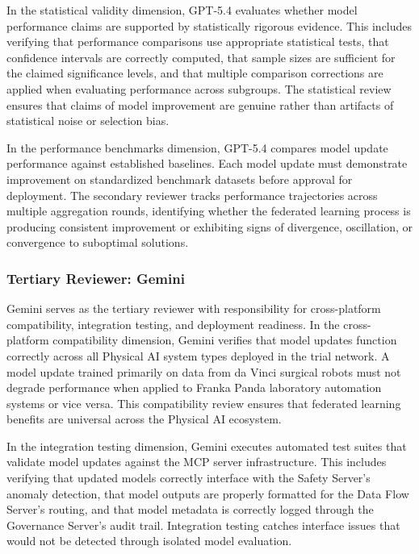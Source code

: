 In the statistical validity dimension, GPT-5.4 evaluates whether model
performance claims are supported by statistically rigorous evidence. This
includes verifying that performance comparisons use appropriate statistical
tests, that confidence intervals are correctly computed, that sample sizes are
sufficient for the claimed significance levels, and that multiple comparison
corrections are applied when evaluating performance across subgroups. The
statistical review ensures that claims of model improvement are genuine rather
than artifacts of statistical noise or selection bias.

In the performance benchmarks dimension, GPT-5.4 compares model update
performance against established baselines. Each model update must demonstrate
improvement on standardized benchmark datasets before approval for deployment.
The secondary reviewer tracks performance trajectories across multiple
aggregation rounds, identifying whether the federated learning process is
producing consistent improvement or exhibiting signs of divergence,
oscillation, or convergence to suboptimal solutions.

\subsubsection{Tertiary Reviewer: Gemini}

Gemini \cite{gemini} serves as the tertiary reviewer with responsibility for
cross-platform compatibility, integration testing, and deployment readiness. In
the cross-platform compatibility dimension, Gemini verifies that model updates
function correctly across all Physical AI system types deployed in the trial
network. A model update trained primarily on data from da Vinci surgical robots
must not degrade performance when applied to Franka Panda laboratory automation
systems or vice versa. This compatibility review ensures that federated
learning benefits are universal across the Physical AI ecosystem.

In the integration testing dimension, Gemini executes automated test suites
that validate model updates against the MCP server infrastructure. This
includes verifying that updated models correctly interface with the Safety
Server's anomaly detection, that model outputs are properly formatted for the
Data Flow Server's routing, and that model metadata is correctly logged through
the Governance Server's audit trail. Integration testing catches interface
issues that would not be detected through isolated model evaluation.

